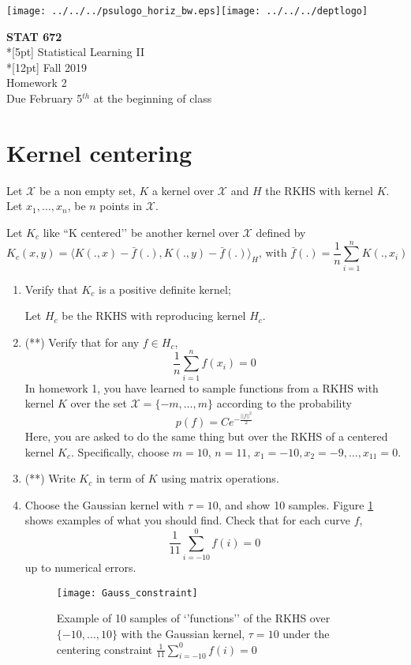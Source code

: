 \documentclass[12pt]{article}
\begin{document}
\thispagestyle{empty}
\texttt{[image: ../../../psulogo\_horiz\_bw.eps]}\hfill\texttt{[image: ../../../deptlogo]}
\vspace{10pt}
\begin{center}
{\large\bf STAT 672}    \\*[5pt] {\Large Statistical Learning II}
\\*[12pt] {\large Fall 2019}
\\ {\large Homework 2}
\\ {\large Due February 5$^{th}$ at the beginning of class}
\end{center}
\vspace{1cm}
\noindent
\section{Kernel centering}
Let $\mathcal{X}$ be a non empty set, $K$ a kernel over $\mathcal{X}$ and $H$ the RKHS with kernel $K$. Let $x_1,\ldots,x_n$, be $n$ points in $\mathcal{X}$. 

Let $K_c$ like ``K centered\rq\rq{} be another kernel over $\mathcal{X}$ defined by 
\begin{equation}
K_c(x,y)=\langle K(.,x)- \bar{f}(.), K(.,y)-\bar{f}(.)\rangle_H \mbox{, with } \bar{f}(.)=\frac{1}{n}\sum_{i=1}^n K(.,x_i)
\end{equation}
\begin{enumerate}
\item Verify that $K_c$ is a positive definite kernel;

\noindent
Let $H_c$ be the RKHS with reproducing kernel $H_c$. 
\item (**) Verify that for any $f \in H_c$, 
\begin{equation}
\frac{1}{n} \sum_{i=1}^n f(x_i)=0
\end{equation}
In homework 1, you have learned to sample functions from a RKHS with kernel $K$ over the set $\mathcal{X}=\{-m,\ldots,m\}$ according to the probability 
\begin{equation}
p(f)=Ce^{-\frac{||f||^2}{2}}
\end{equation} 
Here, you are asked to do the same thing but over the RKHS of a centered kernel $K_c$. Specifically, choose  $m=10$, $n=11$, $x_1=-10,x_2=-9,\ldots,x_{11}=0$. 
\item (**) Write $K_c$ in term of $K$ using matrix operations. 
\item Choose the Gaussian kernel with $\tau=10$, and show 10 samples. Figure \ref{fig:Gauss_constraint} shows examples of what you should find. Check that for each curve $f$, 
\begin{equation}
\frac{1}{11}\sum_{i=-10}^0 f(i)=0
\end{equation}
up to numerical errors.  
\begin{figure}
\texttt{[image: Gauss\_constraint]}
\caption{\label{fig:Gauss_constraint}Example of 10 samples of \lq{}\rq{}functions\rq\rq{} of the RKHS over $\{-10,\ldots,10\}$ with the Gaussian kernel, $\tau=10$ under the centering constraint $\frac{1}{11}\sum_{i=-10}^0 f(i)=0$}
\end{figure}
\end{enumerate}
\end{document}
